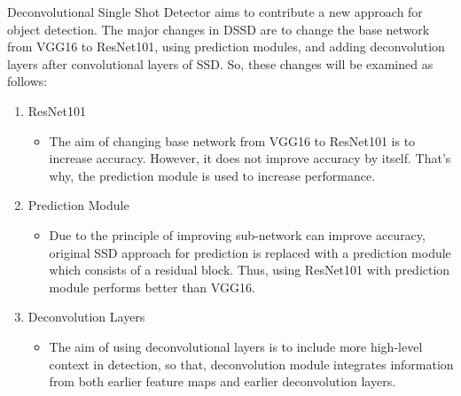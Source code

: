 \documentclass{article}
\begin{document}
\setlength{\parindent}{6ex}

\indent

Deconvolutional Single Shot Detector aims to contribute a new approach for object 
detection. The major changes in DSSD are to change the base network from VGG16 to 
ResNet101, using prediction modules, and adding deconvolution layers after convolutional 
layers of SSD. So, these changes will be examined as follows: 
\begin{enumerate}
    \item ResNet101
    \begin{itemize}
        \item The aim of changing base network from VGG16 to ResNet101 is to 
increase accuracy. However, it does not improve accuracy by itself. That's why, 
the prediction module is used to increase performance.
    \end{itemize}
    \item Prediction Module
    \begin{itemize}
        \item Due to the principle of improving sub-network can improve accuracy, 
original SSD approach for prediction is replaced with a prediction module which 
consists of a residual block. Thus, using ResNet101 with prediction module performs 
better than VGG16.
    \end{itemize}
    \item Deconvolution Layers
    \begin{itemize}
        \item The aim of using deconvolutional layers is to include more high-level 
context in detection, so that, deconvolution module integrates information from both 
earlier feature maps and earlier deconvolution layers. 
    \end{itemize}
\end{enumerate}
\end{document}
